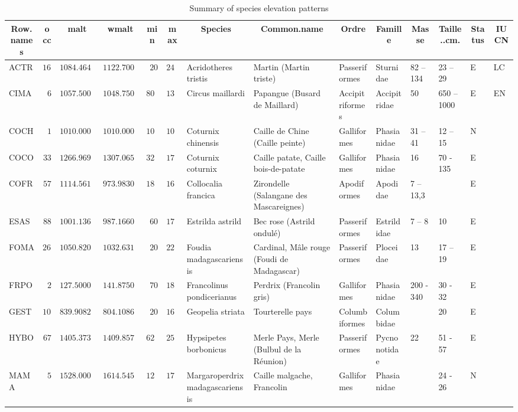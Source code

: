 %
\begin{table}[!tbp]
 \caption{Summary of species elevation patterns\label{era}} 
 \begin{center}
 \begin{tabular}{lrrrrrllllllll}\hline\hline
\multicolumn{1}{c}{Row.names}&\multicolumn{1}{c}{occ}&\multicolumn{1}{c}{malt}&\multicolumn{1}{c}{wmalt}&\multicolumn{1}{c}{min}&\multicolumn{1}{c}{max}&\multicolumn{1}{c}{Species}&\multicolumn{1}{c}{Common.name}&\multicolumn{1}{c}{Ordre}&\multicolumn{1}{c}{Famille}&\multicolumn{1}{c}{Masse}&\multicolumn{1}{c}{Taille..cm.}&\multicolumn{1}{c}{Status}&\multicolumn{1}{c}{IUCN}\tabularnewline
\hline
ACTR&$168$&$1084.464285714286$&$1122.700421940928$&$  20$&$2400$&Acridotheres tristis&Martin (Martin triste)&Passeriformes&Sturnidae&82 – 134&23 – 29&E&LC\tabularnewline
CIMA&$  6$&$1057.500000000000$&$1048.750000000000$&$ 800$&$1370$&Circus maillardi&Papangue (Busard de Maillard)&Accipitriformes&Accipitridae&50&650 – 1000&E&EN \tabularnewline
COCH&$  1$&$1010.000000000000$&$1010.000000000000$&$1010$&$1010$&Coturnix chinensis&Caille de Chine (Caille peinte)&Galliformes&Phasianidae&31 – 41&12 – 15&N&\tabularnewline
COCO&$ 33$&$1266.969696969697$&$1307.065217391304$&$ 320$&$1700$&Coturnix coturnix&Caille patate, Caille bois-de-patate&Galliformes&Phasianidae&16&70 - 135&E&\tabularnewline
COFR&$ 57$&$1114.561403508772$&$ 973.983050847458$&$ 185$&$1660$&Collocalia francica&Zirondelle (Salangane des Mascareignes)&Apodiformes&Apodidae&7 – 13,3&&E&\tabularnewline
ESAS&$ 88$&$1001.136363636364$&$ 987.166064981949$&$  60$&$1720$&Estrilda astrild&Bec rose (Astrild ondulé)&Passeriformes&Estrildidae&7 – 8&10&E&\tabularnewline
FOMA&$268$&$1050.820895522388$&$1032.631336405530$&$  20$&$2250$&Foudia madagascariensis&Cardinal, Mâle rouge (Foudi de Madagascar)&Passeriformes&Ploceidae&13&17 – 19&E&\tabularnewline
FRPO&$  2$&$ 127.500000000000$&$ 141.875000000000$&$  70$&$ 185$&Francolinus pondicerianus&Perdrix (Francolin gris)&Galliformes&Phasianidae&200 - 340&30 - 32&E&\tabularnewline
GEST&$109$&$ 839.908256880734$&$ 804.108695652174$&$  20$&$1620$&Geopelia striata&Tourterelle pays&Columbiformes&Columbidae&&20&E&\tabularnewline
HYBO&$ 67$&$1405.373134328358$&$1409.857142857143$&$ 620$&$2560$&Hypsipetes borbonicus&Merle Pays, Merle (Bulbul de la Réunion)&Passeriformes&Pycnonotidae&22&51 - 57&E&\tabularnewline
MAMA&$  5$&$1528.000000000000$&$1614.545454545455$&$1240$&$1705$&Margaroperdrix madagascariensis&Caille malgache, Francolin&Galliformes&Phasianidae&&24 - 26&N&\tabularnewline

\end{tabular}
\end{center}
\end{table}
